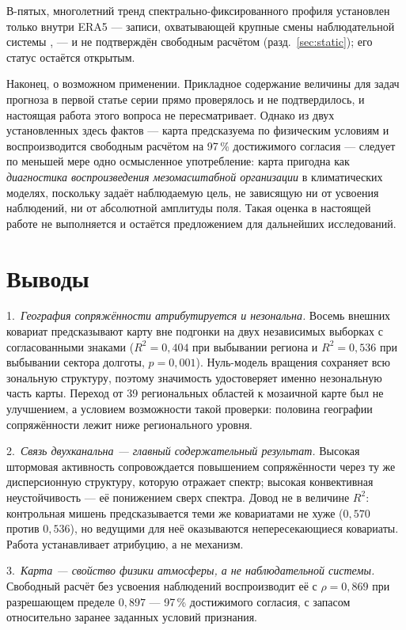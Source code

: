 \documentclass[11pt,a4paper]{article}
\begin{document}
В-пятых, многолетний тренд спектрально-фиксированного профиля установлен только внутри ERA5 --- записи, охватывающей крупные смены наблюдательной системы \cite{Bengtsson2004}, --- и не подтверждён свободным расчётом (разд.~\ref{sec:static}); его статус остаётся открытым.

Наконец, о возможном применении. Прикладное содержание величины для задач прогноза в первой статье серии прямо проверялось и не подтвердилось, и настоящая работа этого вопроса не пересматривает. Однако из двух установленных здесь фактов --- карта предсказуема по физическим условиям и воспроизводится свободным расчётом на 97\,\% достижимого согласия --- следует по меньшей мере одно осмысленное употребление: карта пригодна как \emph{диагностика воспроизведения мезомасштабной организации} в климатических моделях, поскольку задаёт наблюдаемую цель, не зависящую ни от усвоения наблюдений, ни от абсолютной амплитуды поля. Такая оценка в настоящей работе не выполняется и остаётся предложением для дальнейших исследований.

\section{Выводы}
\label{sec:conclusion}

1.~\emph{География сопряжённости атрибутируется и незональна.} Восемь внешних ковариат
предсказывают карту вне подгонки на двух независимых выборках с согласованными знаками
($R^2=0{,}404$ при выбывании региона и $R^2=0{,}536$ при выбывании сектора долготы, $p=0{,}001$).
Нуль-модель вращения сохраняет всю зональную структуру, поэтому значимость удостоверяет именно
незональную часть карты. Переход от 39 региональных областей к мозаичной карте был не улучшением,
а условием возможности такой проверки: половина географии сопряжённости лежит ниже регионального
уровня.

2.~\emph{Связь двухканальна --- главный содержательный результат.} Высокая штормовая активность
сопровождается повышением сопряжённости через ту же дисперсионную структуру, которую отражает
спектр; высокая конвективная неустойчивость --- её понижением сверх спектра. Довод не в величине
$R^2$: контрольная мишень предсказывается теми же ковариатами не хуже ($0{,}570$ против
$0{,}536$), но ведущими для неё оказываются непересекающиеся ковариаты. Работа устанавливает
атрибуцию, а не механизм.

3.~\emph{Карта --- свойство физики атмосферы, а не наблюдательной системы.} Свободный расчёт без
усвоения наблюдений воспроизводит её с $\rho=0{,}869$ при разрешающем пределе $0{,}897$ ---
97\,\% достижимого согласия, с запасом относительно заранее заданных условий признания.
\end{document}
